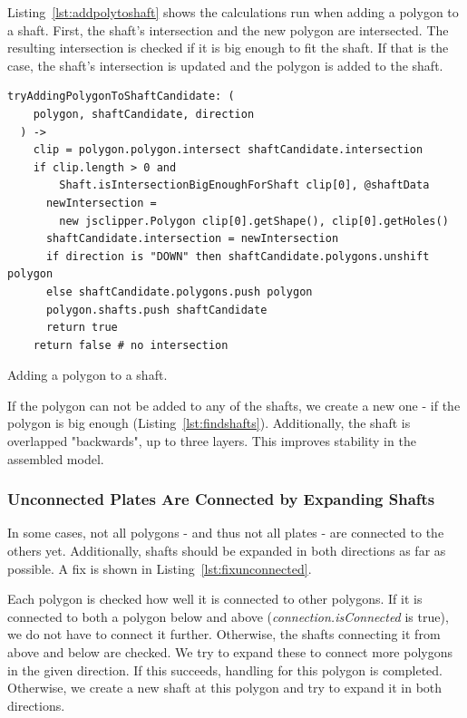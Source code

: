\documentclass[../ClassicThesis.tex]{subfiles}
\begin{document}
Listing~\ref{lst:addpolytoshaft} shows the calculations run when adding a polygon to a shaft. First, the shaft's intersection and the new polygon are intersected. The resulting intersection is checked if it is big enough to fit the shaft. If that is the case, the shaft's intersection is updated and the polygon is added to the shaft.

\begin{listing}
\begin{verbatim}
tryAddingPolygonToShaftCandidate: (
    polygon, shaftCandidate, direction
  ) ->
    clip = polygon.polygon.intersect shaftCandidate.intersection
    if clip.length > 0 and
        Shaft.isIntersectionBigEnoughForShaft clip[0], @shaftData
      newIntersection =
        new jsclipper.Polygon clip[0].getShape(), clip[0].getHoles()
      shaftCandidate.intersection = newIntersection
      if direction is "DOWN" then shaftCandidate.polygons.unshift polygon
      else shaftCandidate.polygons.push polygon
      polygon.shafts.push shaftCandidate
      return true
    return false # no intersection
\end{verbatim}
\caption{Adding a polygon to a shaft.}
\label{lst:addpolytoshaft}
\end{listing}

If the polygon can not be added to any of the shafts, we create a new one - if the polygon is big enough (Listing~\ref{lst:findshafts}). Additionally, the shaft is overlapped "backwards", up to three layers. This improves stability in the assembled model.

\subsubsection{Unconnected Plates Are Connected by Expanding Shafts}

In some cases, not all polygons - and thus not all plates - are connected to the others yet. Additionally, shafts should be expanded in both directions as far as possible. A fix is shown in Listing~\ref{lst:fixunconnected}.

Each polygon is checked how well it is connected to other polygons. If it is connected to both a polygon below and above (\emph{connection.isConnected} is true), we do not have to connect it further. Otherwise, the shafts connecting it from above and below are checked. We try to expand these to connect more polygons in the given direction. If this succeeds, handling for this polygon is completed. Otherwise, we create a new shaft at this polygon and try to expand it in both directions.
\end{document}
